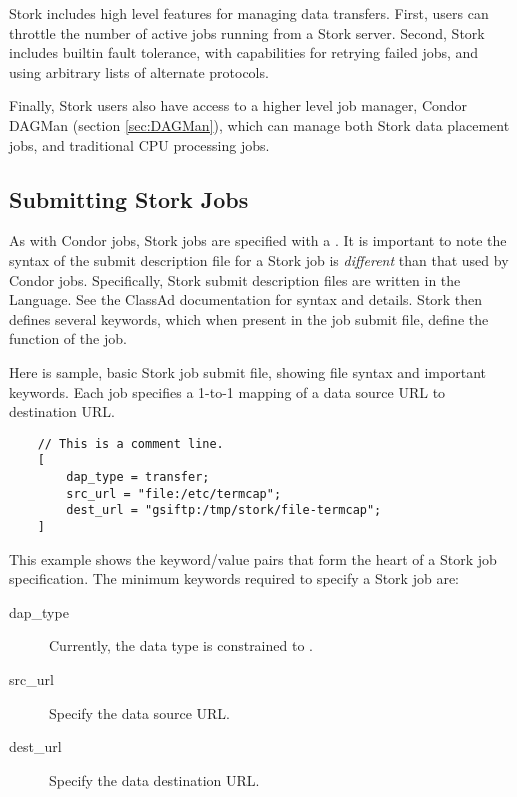 Stork includes high level features for managing data transfers.  First, users
can throttle the number of active jobs running from a Stork server.  Second,
Stork includes builtin fault tolerance, with capabilities for retrying failed
jobs, and using arbitrary lists of alternate protocols.

Finally, Stork users also have access to a higher level job manager, 
Condor DAGMan (section \ref{sec:DAGMan}), which can manage both Stork data
placement jobs, and traditional CPU processing jobs.


\subsection{\label{sec:Stork-Job-Submission}Submitting Stork Jobs}

As with Condor jobs, Stork jobs are specified with a .  It is important to note the syntax of the submit description file for a
Stork job is \emph{different} than that used by Condor jobs.  Specifically,
Stork submit description files are written in the
 Language.
See the ClassAd documentation for syntax and details.  Stork then defines
several keywords, which when present in the job submit file, define the
function of the job.

Here is sample, basic Stork job submit file, showing file syntax and important
keywords.  Each job specifies a 1-to-1 mapping of a data source URL to
destination URL.

\begin{verbatim}
	// This is a comment line.
	[
		dap_type = transfer;
		src_url = "file:/etc/termcap";
		dest_url = "gsiftp:/tmp/stork/file-termcap";
	]
\end{verbatim}

This example shows the keyword/value pairs that form the heart of a Stork job
specification.  The minimum keywords required to specify a Stork job are:

\begin{description}
	\item[dap\_type] Currently, the data type is constrained to 
	.

	\item[src\_url]  Specify the data source URL.

	\item[dest\_url]  Specify the data destination URL.

\end{description}

